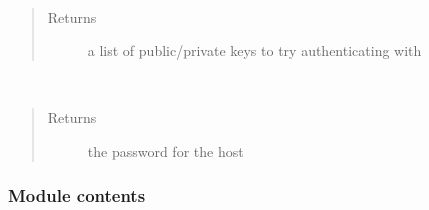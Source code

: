 \documentclass[letterpaper,12pt,english]{sphinxmanual}
\begin{document}
\begin{fulllineitems}
\begin{fulllineitems}
\end{fulllineitems}


\begin{fulllineitems}
\label{\detokenize{PARyOpt.evaluators:PARyOpt.evaluators.connection.Host.get_keys}}~\begin{quote}\begin{description}
\item[{Returns}] \leavevmode
\sphinxAtStartPar
a list of public/private keys to try authenticating with

\end{description}\end{quote}

\end{fulllineitems}


\begin{fulllineitems}
\label{\detokenize{PARyOpt.evaluators:PARyOpt.evaluators.connection.Host.get_password}}~\begin{quote}\begin{description}
\item[{Returns}] \leavevmode
\sphinxAtStartPar
the password for the host

\end{description}\end{quote}

\end{fulllineitems}


\end{fulllineitems}



\subsubsection{Module contents}
\label{\detokenize{PARyOpt.evaluators:module-PARyOpt.evaluators}}\label{\detokenize{PARyOpt.evaluators:module-contents}}
\end{document}
